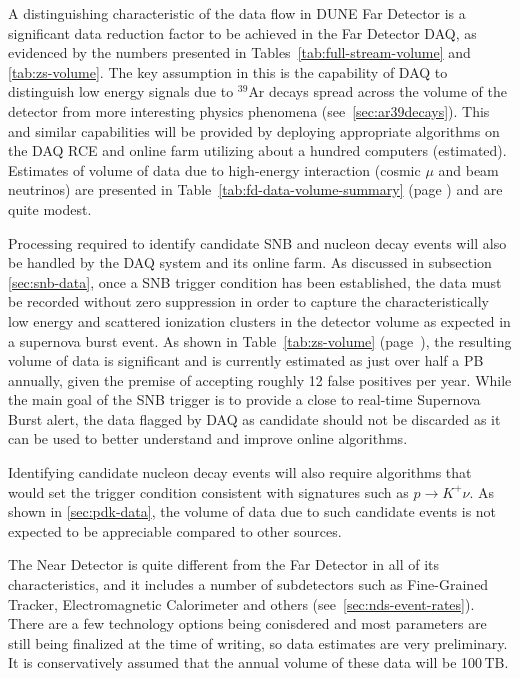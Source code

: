 A distinguishing characteristic of the data flow in DUNE Far Detector is a significant data reduction factor to be achieved
in the Far Detector DAQ, as evidenced by the numbers presented in Tables~\ref{tab:full-stream-volume} and \ref{tab:zs-volume}.
The key assumption in this is the capability of DAQ to distinguish low energy signals  due to $^{39}$Ar decays spread
across the volume of the detector from more interesting physics phenomena (see~\ref{sec:ar39decays}).
This and similar capabilities will be provided
by deploying appropriate algorithms on the DAQ RCE and online farm utilizing about a hundred computers (estimated).
Estimates of volume of data due to high-energy interaction (cosmic $\mu$ and beam neutrinos) are presented in
Table~\ref{tab:fd-data-volume-summary} (page \pageref{tab:fd-data-volume-summary}) and are quite modest.

Processing required to identify candidate SNB and nucleon decay events will also be handled by the DAQ system and its online farm.
As discussed in subsection \ref{sec:snb-data}, once a SNB trigger condition has been established, the data must
be recorded without zero suppression in order to capture the characteristically low energy and scattered ionization
clusters in the detector volume as expected in a supernova burst event. As shown in Table~\ref{tab:zs-volume} (page~\pageref{tab:zs-volume}),
the resulting volume of data is significant and is currently estimated as just over half a PB annually, given the premise of accepting roughly
12 false positives per year. While the main goal of the SNB trigger is to provide a close to real-time Supernova Burst alert, the data
flagged by DAQ as candidate should not be discarded as it can be used to better understand and improve online algorithms.

Identifying candidate nucleon decay events will also require algorithms that would set the trigger condition consistent
with signatures such as $p \rightarrow K^+\nu$. As shown in \ref{sec:pdk-data}, the volume of data due to such candidate
events is not expected to be appreciable compared to other sources.

The Near Detector is quite different from the Far Detector in all of its characteristics, and it includes a number of subdetectors
such as Fine-Grained Tracker, Electromagnetic Calorimeter and others (see~\ref{sec:nds-event-rates}). There are a few technology
options being conisdered and most parameters are still being finalized at the time of writing, so data estimates are very preliminary.
It is conservatively assumed that the annual volume of these data will be 100\,TB.

